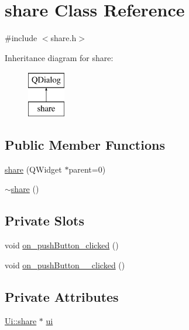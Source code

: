 \hypertarget{classshare}{\section{share Class Reference}
\label{classshare}
}


{\ttfamily \#include $<$share.\-h$>$}

Inheritance diagram for share\-:\begin{figure}[H]
\begin{center}
\leavevmode
\includegraphics[height=2.000000cm]{classshare}
\end{center}
\end{figure}
\subsection*{Public Member Functions}
\begin{DoxyCompactItemize}
\item 
\hyperlink{classshare_aa84f915f8b261619eb3c377f0d8a6594}{share} (Q\-Widget $\ast$parent=0)
\item 
\hyperlink{classshare_accf81e5d4b2bb14e556459a3a2ebfff2}{$\sim$share} ()
\end{DoxyCompactItemize}
\subsection*{Private Slots}
\begin{DoxyCompactItemize}
\item 
void \hyperlink{classshare_a225c60301dc8ae6425481c2ab44c6946}{on\-\_\-push\-Button\-\_\-clicked} ()
\item 
void \hyperlink{classshare_a5408900b1665d025d35a6958a352e35b}{on\-\_\-push\-Button\-\_\-\_\-clicked} ()
\end{DoxyCompactItemize}
\subsection*{Private Attributes}
\begin{DoxyCompactItemize}
\item 
\hyperlink{classUi_1_1share}{Ui\-::share} $\ast$ \hyperlink{classshare_aea5bdfca31f8edb6872633d87b3062d3}{ui}
\end{DoxyCompactItemize}


